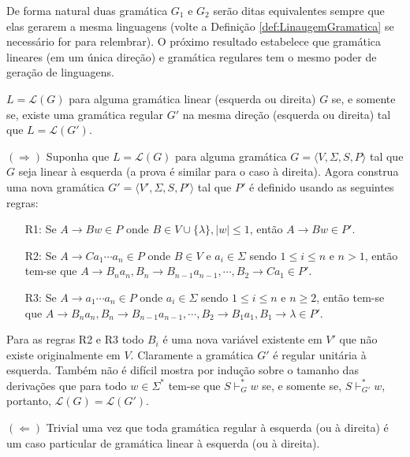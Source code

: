 De forma natural duas gramática $G_1$ e $G_2$ serão ditas equivalentes sempre que elas gerarem a mesma linguagens (volte a Definição \ref{def:LinaugemGramatica} se necessário for para relembrar). O próximo resultado estabelece que gramática lineares (em um única direção) e gramática regulares tem o mesmo poder de geração de linguagens.

\begin{teorema}\label{teo:SimplificacaoRegular}
	$L = \mathcal{L}(G)$ para alguma gramática linear (esquerda ou direita)  $G$ se, e somente se, existe uma gramática regular $G'$ na mesma direção (esquerda ou direita) tal que $L = \mathcal{L}(G')$.
\end{teorema}

\begin{prova}
  $(\Rightarrow)$ Suponha que $L = \mathcal{L}(G)$ para alguma gramática $G = \langle V, \Sigma, S, P \rangle$ tal que $G$ seja linear à esquerda (a prova é similar para o caso à direita). Agora construa uma nova gramática $G' = \langle V', \Sigma, S, P' \rangle$ tal que $P'$ é definido usando as seguintes regras: 
		
	\begin{itemize}
		\item[R1:] Se $A \rightarrow Bw \in P$ onde $B \in V \cup \{\lambda\},  |w| \leq 1$, então $A \rightarrow Bw \in P'$.
		\item[R2:] Se $A \rightarrow Ca_1\cdots a_n \in P$ onde $B \in V$ e $a_i \in \Sigma$ sendo $1 \leq i \leq n$ e $n > 1$, então tem-se que $A \rightarrow B_na_n, B_n \rightarrow B_{n-1}a_{n-1}, \cdots, B_2 \rightarrow Ca_1 \in P'$.
		\item[R3:] Se $A \rightarrow a_1\cdots a_n \in P$ onde $a_i \in \Sigma$ sendo $1 \leq i \leq n$ e $n \geq 2$, então tem-se que $A \rightarrow B_na_n, B_n \rightarrow B_{n-1}a_{n-1}, \cdots, B_2 \rightarrow B_1a_1, B_1 \rightarrow \lambda \in P'$.
	\end{itemize}

	Para as regras R2 e R3 todo $B_i$ é uma nova variável existente em $V'$ que não existe originalmente em $V$. Claramente a gramática $G'$ é regular unitária à esquerda. Também não é difícil mostra por indução sobre o tamanho das derivações que para todo $w \in \Sigma^*$ tem-se que $S \vdash^*_G w$ se, e somente se, $S \vdash^*_{G'} w$, portanto, $\mathcal{L}(G) = \mathcal{L}(G')$.

	$(\Leftarrow)$ Trivial uma vez que toda gramática regular à esquerda (ou à direita) é um caso particular de gramática linear à esquerda (ou à direita).
\end{prova}

